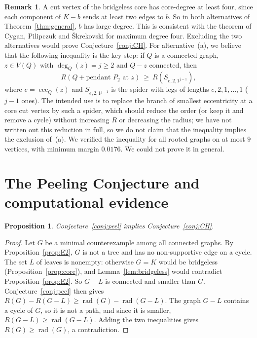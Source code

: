 \documentclass[11pt,a4paper]{article}
\newtheorem{proposition}[theorem]{Proposition}
\theoremstyle{definition}
\newtheorem{remark}[theorem]{Remark}
\newcommand{\rad}{\operatorname{rad}}
\newcommand{\ecc}{\operatorname{ecc}}
\begin{document}
\begin{remark}
A cut vertex of the bridgeless core has core-degree at least four, since each component of $K-b$ sends at least two edges to $b$. So in both alternatives of Theorem~\ref{thm:general}, $b$ has large degree. This is consistent with the theorem of Cygan, Pilipczuk and \v{S}krekovski for maximum degree four. Excluding the two alternatives would prove Conjecture~\ref{conj:CH}. For alternative~(a), we believe that the following inequality is the key step: if $Q$ is a connected graph, $z\in V(Q)$ with $\deg_Q(z)=j\ge2$ and $Q-z$ connected, then
\[
R(Q+\text{pendant }P_2\text{ at }z)\ \ge\ R(S_{e,2,1^{j-1}}),
\]
where $e=\ecc_Q(z)$ and $S_{e,2,1^{j-1}}$ is the spider with legs of lengths $e,2,1,\dots,1$ ($j-1$ ones). The intended use is to replace the branch of smallest eccentricity at a core cut vertex by such a spider, which should reduce the order (or keep it and remove a cycle) without increasing $R$ or decreasing the radius; we have not written out this reduction in full, so we do not claim that the inequality implies the exclusion of~(a). We verified the inequality for all rooted graphs on at most $9$ vertices, with minimum margin $0.0176$. We could not prove it in general.
\end{remark}

\section{The Peeling Conjecture and computational evidence}\label{sec:evidence}

\begin{proposition}\label{prop:peelimplies}
Conjecture~\ref{conj:peel} implies Conjecture~\ref{conj:CH}.
\end{proposition}
\begin{proof}
Let $G$ be a minimal counterexample among all connected graphs. By Proposition~\ref{prop:E2}, $G$ is not a tree and has no non-supportive edge on a cycle. The set $L$ of leaves is nonempty: otherwise $G=K$ would be bridgeless (Proposition~\ref{prop:core}), and Lemma~\ref{lem:bridgeless} would contradict Proposition~\ref{prop:E2}. So $G-L$ is connected and smaller than $G$. Conjecture~\ref{conj:peel} then gives $R(G)-R(G-L)\ge\rad(G)-\rad(G-L)$. The graph $G-L$ contains a cycle of $G$, so it is not a path, and since it is smaller, $R(G-L)\ge\rad(G-L)$. Adding the two inequalities gives $R(G)\ge\rad(G)$, a contradiction.
\end{proof}
\end{document}
